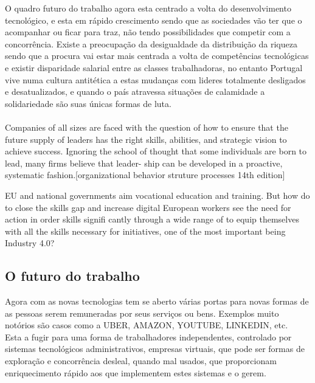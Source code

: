O quadro futuro do trabalho agora esta centrado a volta do desenvolvimento tecnológico, e esta em rápido crescimento sendo que as sociedades vão ter que o acompanhar ou ficar para traz, não tendo possibilidades que competir com a concorrência. Existe a preocupação da desigualdade da distribuição da riqueza sendo que a procura vai estar mais centrada a volta de competências tecnológicas e existir disparidade salarial entre as classes trabalhadoras, no entanto Portugal vive numa cultura antitética a estas mudanças com lideres totalmente desligados e desatualizados, e quando o país atravessa situações de calamidade a solidariedade são suas únicas formas de luta.\\ \\

Companies of all sizes are faced with the question of how to ensure that the future supply of leaders has the right skills, abilities, and strategic vision to achieve success. Ignoring the school of thought that some individuals are born to lead, many firms believe that leader- ship can be developed in a proactive, systematic fashion.[organizational behavior struture processes 14th edition]


EU and national governments aim vocational education and training. But how do to close the skills gap and increase digital European workers see the need for action in order skills signifi cantly through a wide range of to equip themselves with all the skills necessary for initiatives, one of the most important being Industry 4.0?













\subsection{O futuro do trabalho}
\qquad Agora com as novas tecnologias tem se aberto várias portas para novas formas de as pessoas serem remuneradas por seus serviços ou bens. Exemplos muito notórios são casos como a UBER, AMAZON, YOUTUBE, LINKEDIN, etc.\\

Esta a fugir para uma forma de trabalhadores independentes, controlado por sistemas tecnológicos administrativos, empresas virtuais, que pode ser formas de exploração e concorrência desleal, quando mal usados, que proporcionam enriquecimento rápido aos que implementem estes sistemas e o gerem.

